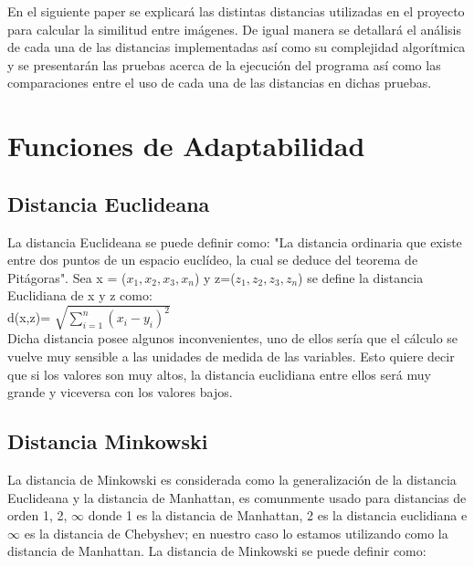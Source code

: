 \documentclass[conference]{C:/Program Files (x86)/MiKTeX 2.9/tex/latex/ltxmisc/IEEEtran}
\begin{document}
\par
En el siguiente paper se explicará las distintas distancias utilizadas en el proyecto para calcular la similitud entre imágenes. De igual manera se detallará el análisis de cada una de las distancias implementadas así como su complejidad algorítmica y se presentarán las pruebas acerca de la ejecución del programa así como las comparaciones entre el uso de cada una de las distancias en dichas pruebas.\\


 

\section{Funciones de Adaptabilidad}

\subsection{Distancia Euclideana}

La distancia Euclideana se puede definir como: "La distancia ordinaria que existe entre dos puntos de un espacio euclídeo, la cual se deduce del teorema de Pitágoras". Sea x = ($x_1, x_2, x_3, x_n$) y  z=($z_1, z_2, z_3, z_n$) se define la distancia Euclidiana de x y z como:\\

\hspace{50pt} d(x,z)= $\sqrt{\sum\limits_{i=1}^{n}(x_i - y_i)^2}$\\

Dicha distancia posee algunos inconvenientes, uno de ellos sería que el cálculo se vuelve muy sensible a las unidades de medida de las variables. Esto quiere decir que si los valores son muy altos, la distancia euclidiana entre ellos será muy grande y viceversa con los valores bajos.

\subsection{Distancia Minkowski}
La distancia de Minkowski es considerada como la generalización de la distancia Euclideana y la distancia de Manhattan, es comunmente usado para distancias de orden 1, 2, $\infty$ donde 1 es la distancia de Manhattan, 2 es la distancia euclidiana e $\infty$ es la distancia de Chebyshev;  en nuestro caso lo estamos utilizando como la distancia de Manhattan. La distancia de Minkowski se puede definir como:
\end{document}

